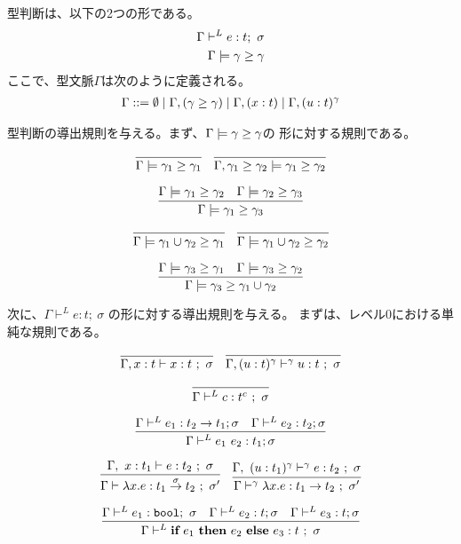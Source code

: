 型判断は、以下の2つの形である。
\begin{align*}
  \Gamma \vdash^{L} e : t ;~\sigma \\
  \Gamma \models \gamma \ge \gamma
\end{align*}
ここで、型文脈$\Gamma$は次のように定義される。
\begin{align*}
  \Gamma ::= \emptyset
  \mid \Gamma, (\gamma \ge \gamma)
  \mid \Gamma, (x : t)
  \mid \Gamma, (u : t)^{\gamma} 
\end{align*}

型判断の導出規則を与える。まず、$\Gamma \models \gamma \ge \gamma$の
形に対する規則である。

\[
  \infer
  {\Gamma \models \gamma_1 \ord \gamma_1}
  {}
\quad
  \infer
  {\Gamma, \gamma_1 \ord \gamma_2 \models \gamma_1 \ord \gamma_2}
  {}
\]

\[
  \infer
  {\Gamma \models \gamma_1 \ord \gamma_3}
  {\Gamma \models \gamma_1 \ord \gamma_2 & \Gamma \models \gamma_2 \ord \gamma_3}
\]

\[
  \infer
  {\Gamma \models \gamma_1 \cup \gamma_2 \ord \gamma_1}
  {}
\quad
  \infer
  {\Gamma \models \gamma_1 \cup \gamma_2 \ord \gamma_2}
  {}
\]

\[
  \infer
  {\Gamma \models \gamma_3 \ord \gamma_1 \cup \gamma_2}
  {\Gamma \models \gamma_3 \ord \gamma_1
  &\Gamma \models \gamma_3 \ord \gamma_2}
\]



次に、$\Gamma \vdash^{L} e : t ;~\sigma$ の形に対する導出規則を与える。
まずは、レベル0における単純な規則である。

\[
  \infer
  {\Gamma, x : t \vdash x : t ~;~ \sigma}
  {}
\quad
  \infer
  {\Gamma, (u : t)^\gamma \vdash^\gamma u : t ~;~ \sigma}
  {}
\]

\[
  \infer
  {\Gamma \vdash^{L} c : t^c ~;~\sigma}
  {}
\]

\[
  \infer
  {\Gamma \vdash^{L} e_1~ e_2 : t_1 ; \sigma}
  {\Gamma \vdash^{L} e_1 : t_2 \to t_1 ; \sigma
    & \Gamma \vdash^{L} e_2 : t_2  ; \sigma
  }
\]

\[
  \infer
  {\Gamma \vdash \fun{x}{e} : \funT{t_1}{t_2}{\sigma} ~;~\sigma'}
  {\Gamma,~x : t_1 \vdash e : t_2 ~;~ \sigma}
\quad
  \infer
  {\Gamma \vdash^\gamma \fun{x}{e} : \funT{t_1}{t_2}{} ~;~\sigma'}
  {\Gamma,~(u : t_1)^\gamma \vdash^\gamma e : t_2 ~;~ \sigma}
\]

\[
  \infer
  {\Gamma \vdash^{L} \ift{e_1}{e_2}{e_3} : t ~;~ \sigma}
  {\Gamma \vdash^{L} e_1 : \boolT ;~ \sigma
    & \Gamma \vdash^{L} e_2 : t ; \sigma
    & \Gamma \vdash^{L} e_3 : t ; \sigma}
\]

